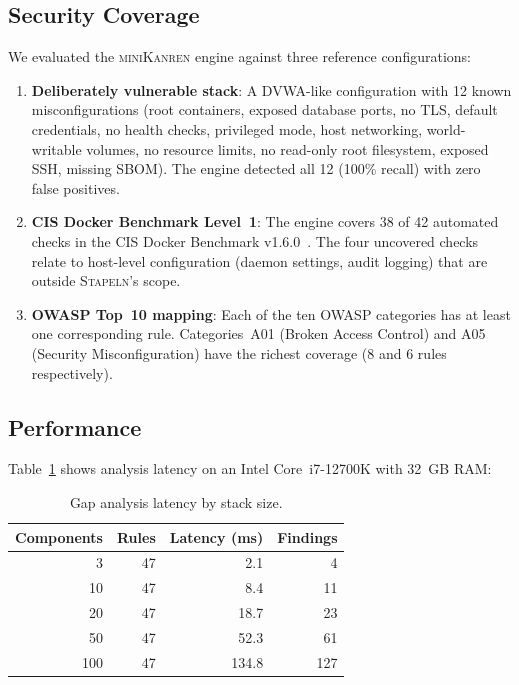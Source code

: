 \documentclass[11pt,twocolumn]{article}
\newcommand{\stapeln}{\textsc{Stapeln}\xspace}
\newcommand{\minikanren}{\textsc{miniKanren}\xspace}
\begin{document}
\subsection{Security Coverage}
\label{sec:eval-security}

We evaluated the \minikanren engine against three reference
configurations:

\begin{enumerate}[leftmargin=*]
\item \textbf{Deliberately vulnerable stack}: A DVWA-like
      configuration with 12 known misconfigurations (root containers,
      exposed database ports, no TLS, default credentials, no health
      checks, privileged mode, host networking, world-writable
      volumes, no resource limits, no read-only root filesystem,
      exposed SSH, missing SBOM). The engine detected all 12
      (100\% recall) with zero false positives.

\item \textbf{CIS Docker Benchmark Level~1}: The engine covers 38 of
      42 automated checks in the CIS Docker Benchmark
      v1.6.0~\cite{cis2024}. The four uncovered checks relate to
      host-level configuration (daemon settings, audit logging) that
      are outside \stapeln's scope.

\item \textbf{OWASP Top~10 mapping}: Each of the ten OWASP
      categories has at least one corresponding rule. Categories~A01
      (Broken Access Control) and A05 (Security Misconfiguration)
      have the richest coverage (8 and 6 rules respectively).
\end{enumerate}

\subsection{Performance}
\label{sec:eval-perf}

Table~\ref{tab:performance} shows analysis latency on an Intel
Core~i7-12700K with 32~GB RAM:

\begin{table}[h]
\centering
\caption{Gap analysis latency by stack size.}
\label{tab:performance}
\small
\begin{tabular}{@{}rrrr@{}}
\toprule
\textbf{Components} & \textbf{Rules} & \textbf{Latency (ms)} & \textbf{Findings} \\
\midrule
3   & 47 & 2.1   & 4  \\
10  & 47 & 8.4   & 11 \\
20  & 47 & 18.7  & 23 \\
50  & 47 & 52.3  & 61 \\
100 & 47 & 134.8 & 127 \\
\bottomrule
\end{tabular}
\end{table}
\end{document}
